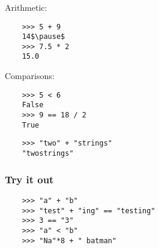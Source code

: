 \documentclass[notes]{beamer}
\begin{document}
\begin{frame}[fragile]
\begin{itemize}
		
		
		
	\end{itemize}
\end{frame}

\begin{frame}[fragile]
	\frametitle{}
	
	Arithmetic:
	
	\begin{lstlisting}
	>>> 5 + 9
	14$\pause$
	>>> 7.5 * 2
	15.0
	\end{lstlisting}
	
	\pause
	
	Comparisons:
	
	\begin{lstlisting}
	>>> 5 < 6
	False
	>>> 9 == 18 / 2
	True
	\end{lstlisting}
	
	\pause

	\begin{lstlisting}
	>>> "two" + "strings"
	"twostrings" 
	\end{lstlisting}
\end{frame}

\begin{frame}[fragile]
	\frametitle{Try it out}

	\begin{lstlisting}
	>>> "a" + "b"
	>>> "test" + "ing" == "testing"
	>>> 3 == "3"
	>>> "a" < "b"
	>>> "Na"*8 + " batman"
	\end{lstlisting}
\end{frame}
\end{document}
